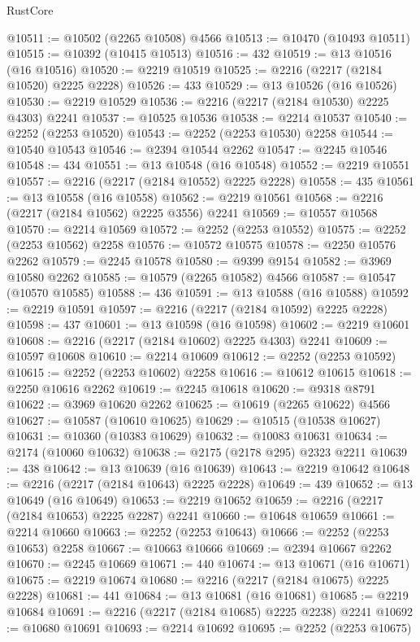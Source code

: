 \begin{lexlean}{RustCore}
\begin{coremodule}
@10511 := @10502 (@2265 @10508) @4566
@10513 := @10470 (@10493 @10511)
@10515 := @10392 (@10415 @10513)
@10516 := 432
@10519 := @13 @10516 (@16 @10516)
@10520 := @2219 @10519
@10525 := @2216 (@2217 (@2184 @10520) @2225 @2228)
@10526 := 433
@10529 := @13 @10526 (@16 @10526)
@10530 := @2219 @10529
@10536 := @2216 (@2217 (@2184 @10530) @2225 @4303) @2241
@10537 := @10525 @10536
@10538 := @2214 @10537
@10540 := @2252 (@2253 @10520)
@10543 := @2252 (@2253 @10530) @2258
@10544 := @10540 @10543
@10546 := @2394 @10544 @2262
@10547 := @2245 @10546
@10548 := 434
@10551 := @13 @10548 (@16 @10548)
@10552 := @2219 @10551
@10557 := @2216 (@2217 (@2184 @10552) @2225 @2228)
@10558 := 435
@10561 := @13 @10558 (@16 @10558)
@10562 := @2219 @10561
@10568 := @2216 (@2217 (@2184 @10562) @2225 @3556) @2241
@10569 := @10557 @10568
@10570 := @2214 @10569
@10572 := @2252 (@2253 @10552)
@10575 := @2252 (@2253 @10562) @2258
@10576 := @10572 @10575
@10578 := @2250 @10576 @2262
@10579 := @2245 @10578
@10580 := @9399 @9154
@10582 := @3969 @10580 @2262
@10585 := @10579 (@2265 @10582) @4566
@10587 := @10547 (@10570 @10585)
@10588 := 436
@10591 := @13 @10588 (@16 @10588)
@10592 := @2219 @10591
@10597 := @2216 (@2217 (@2184 @10592) @2225 @2228)
@10598 := 437
@10601 := @13 @10598 (@16 @10598)
@10602 := @2219 @10601
@10608 := @2216 (@2217 (@2184 @10602) @2225 @4303) @2241
@10609 := @10597 @10608
@10610 := @2214 @10609
@10612 := @2252 (@2253 @10592)
@10615 := @2252 (@2253 @10602) @2258
@10616 := @10612 @10615
@10618 := @2250 @10616 @2262
@10619 := @2245 @10618
@10620 := @9318 @8791
@10622 := @3969 @10620 @2262
@10625 := @10619 (@2265 @10622) @4566
@10627 := @10587 (@10610 @10625)
@10629 := @10515 (@10538 @10627)
@10631 := @10360 (@10383 @10629)
@10632 := @10083 @10631
@10634 := @2174 (@10060 @10632)
@10638 := @2175 (@2178 @295) @2323 @2211
@10639 := 438
@10642 := @13 @10639 (@16 @10639)
@10643 := @2219 @10642
@10648 := @2216 (@2217 (@2184 @10643) @2225 @2228)
@10649 := 439
@10652 := @13 @10649 (@16 @10649)
@10653 := @2219 @10652
@10659 := @2216 (@2217 (@2184 @10653) @2225 @2287) @2241
@10660 := @10648 @10659
@10661 := @2214 @10660
@10663 := @2252 (@2253 @10643)
@10666 := @2252 (@2253 @10653) @2258
@10667 := @10663 @10666
@10669 := @2394 @10667 @2262
@10670 := @2245 @10669
@10671 := 440
@10674 := @13 @10671 (@16 @10671)
@10675 := @2219 @10674
@10680 := @2216 (@2217 (@2184 @10675) @2225 @2228)
@10681 := 441
@10684 := @13 @10681 (@16 @10681)
@10685 := @2219 @10684
@10691 := @2216 (@2217 (@2184 @10685) @2225 @2238) @2241
@10692 := @10680 @10691
@10693 := @2214 @10692
@10695 := @2252 (@2253 @10675)

\end{coremodule}
\end{lexlean}
